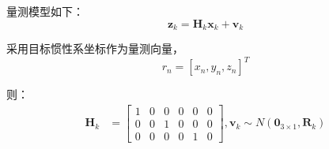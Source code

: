 量测模型如下：\begin{equation} \boldsymbol  z_{k} = \boldsymbol H_k\boldsymbol x_k + \boldsymbol {v}_{k} \end{equation}
\par
采用目标惯性系坐标作为量测向量，\begin{equation} r_n = [x_n,y_n,z_n]^T \end{equation} 
\par
则：
\begin{equation} \begin{aligned} \boldsymbol H_k &=  \left[\begin{array}{cccccc} 1 & 0 &0 &0 &  0 &0   \\ 0 &0 &1 &0 &0 &0 \\ 0 &0 &0 &0 &1 &0  \end{array}\right],\boldsymbol {v}_{k} \sim N\left(\boldsymbol 0_{3 \times 1}, \boldsymbol {R}_k\right) \end{aligned} \end{equation}
\par

